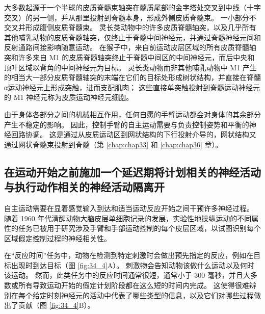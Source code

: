 大多数起源于一个半球的皮质脊髓束轴突在髓质尾部的金字塔处交叉到中线（十字交叉）的另一侧，并从那里投射到脊髓本身，形成外侧皮质脊髓束。
一小部分不交叉并形成腹侧皮质脊髓束。
灵长类动物中的许多皮质脊髓轴突，以及几乎所有其他哺乳动物的皮质脊髓轴突，仅终止于脊髓中间神经元，并通过脊髓神经元间和反射通路间接影响随意运动。
在猴子中，来自前运动皮层区域的所有皮质脊髓轴突和许多来自 M1 的皮质脊髓轴突终止于脊髓中间区的中间神经元，而后中央和顶叶区域以背角的中间神经元为目标。
灵长类动物而非其他哺乳动物中 M1 产生的相当大一部分皮质脊髓轴突的末端在它们的目标处形成树状结构，并直接在脊髓α运动神经元上形成突触，进而支配肌肉；
这些直接单突触投射到脊髓运动神经元的 M1 神经元称为皮质运动神经元细胞。


由于身体各部分之间的机械相互作用，任何自愿的手臂运动都会对身体的其余部分产生不稳定的影响。
因此，控制手臂的自主运动需要与负责控制姿势和平衡的神经回路协调。
这是通过从皮质运动区到网状结构的下行投射介导的，网状结构又通过网状脊髓束投射到脊髓（第 \ref{chap:chap33} 和 \ref{chap:chap36} 章）。


\subsection{在运动开始之前施加一个延迟期将计划相关的神经活动与执行动作相关的神经活动隔离开}

自主运动需要在显着感觉输入到达和适当运动反应开始之间干预许多神经过程。
随着 1960 年代清醒动物大脑皮层单细胞记录的发展，实验性地操纵运动的不同属性的任务已被用于研究涉及手臂和手部运动控制的每个皮层区域，以试图识别每个区域假定控制过程的神经相关性。


在“反应时间”任务中，动物在检测到特定刺激时会做出预先指定的反应，例如在目标出现时到达目标（图 \ref{fig:34_4}A）。 
刺激物会告知动物该做什么运动以及何时该运动。
然而，此类任务中的反应时间通常很短，通常小于 300 毫秒，并且大多数或所有导致运动开始的假定计划阶段都在这么短的时间内完成。
这使得很难辨别在每个给定时刻神经元的活动中代表了哪些类型的信息，以及它们对哪些过程做出了贡献（图 \ref{fig:34_4}B）。


